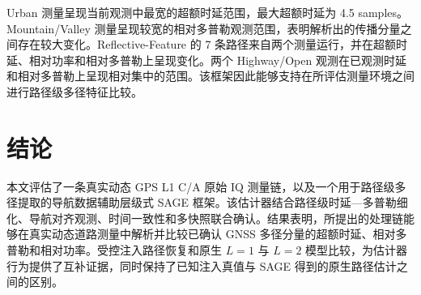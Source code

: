 \documentclass[conference]{IEEEtran}
\begin{document}
Urban 测量呈现当前观测中最宽的超额时延范围，最大超额时延为 4.5 samples。Mountain/Valley 测量呈现较宽的相对多普勒观测范围，表明解析出的传播分量之间存在较大变化。Reflective-Feature 的 7 条路径来自两个测量运行，并在超额时延、相对功率和相对多普勒上呈现变化。两个 Highway/Open 观测在已观测时延和相对多普勒上呈现相对集中的范围。该框架因此能够支持在所评估测量环境之间进行路径级多径特征比较。

\section{结论}
本文评估了一条真实动态 GPS L1 C/A 原始 IQ 测量链，以及一个用于路径级多径提取的导航数据辅助层级式 SAGE 框架。该估计器结合路径级时延—多普勒细化、导航对齐观测、时间一致性和多快照联合确认。结果表明，所提出的处理链能够在真实动态道路测量中解析并比较已确认 GNSS 多径分量的超额时延、相对多普勒和相对功率。受控注入路径恢复和原生 $L=1$ 与 $L=2$ 模型比较，为估计器行为提供了互补证据，同时保持了已知注入真值与 SAGE 得到的原生路径估计之间的区别。



\end{document}

